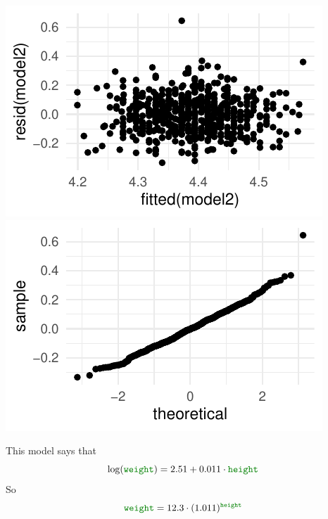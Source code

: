 \documentclass[twoside]{book}\usepackage[]{graphicx}\usepackage[]{xcolor}
\makeatletter
\def\maxwidth{ %
  \ifdim\Gin@nat@width>\linewidth
    \linewidth
  \else
    \Gin@nat@width
  \fi
}
\newenvironment{knitrout}{}{} %
\newcommand{\variable}[1]{{\color{green!50!black}\texttt{#1}}}
\makeatother
\begin{document}
\begin{solution}
\begin{enumerate}
\begin{knitrout}
{\centering \includegraphics[width=\maxwidth]{figures/fig-unnamed-chunk-237-1} 
\includegraphics[width=\maxwidth]{figures/fig-unnamed-chunk-237-2} 

}



\end{knitrout}
This model says that
\[
\log( \variable{weight} ) 
	= 2.51 + 0.011 \cdot \variable{height}
\]
So
\[
\variable{weight}  
= 12.3 
		\cdot (1.011)^{\variable{height}}
\]
\end{enumerate}
\end{solution}
\end{document}
